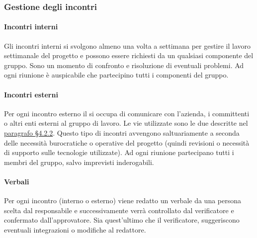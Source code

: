 \subsubsection{Gestione degli incontri}
	\paragraph{Incontri interni}
	Gli incontri interni si svolgono almeno una volta a settimana per gestire il lavoro settimanale del progetto e possono essere richiesti da un qualsiasi componente del gruppo. Sono un momento di confronto e risoluzione di eventuali problemi. Ad ogni riunione è auspicabile che partecipino tutti i componenti del gruppo.
	\paragraph{Incontri esterni}
	Per ogni incontro esterno il \RdP{} si occupa di comunicare con l'azienda, i committenti o altri enti esterni al gruppo di lavoro. 
	Le vie utilizzate sono le due descritte nel \hyperref[sec:Comunicazioni esterne]{paragrafo \S4.2.2}.
	Questo tipo di incontri avvengono saltuariamente a seconda delle necessità burocratiche o operative del progetto (quindi revisioni o necessità di supporto sulle tecnologie utilizzate).
	Ad ogni riunione partecipano tutti i membri del gruppo, salvo imprevisti inderogabili.
	\paragraph{Verbali}
	Per ogni incontro (interno o esterno) viene redatto un verbale da una persona scelta dal responsabile e successivamente verrà controllato dal verificatore e confermato dall’approvatore. Sia quest'ultimo che il verificatore, suggeriscono eventuali integrazioni o modifiche al redattore.

